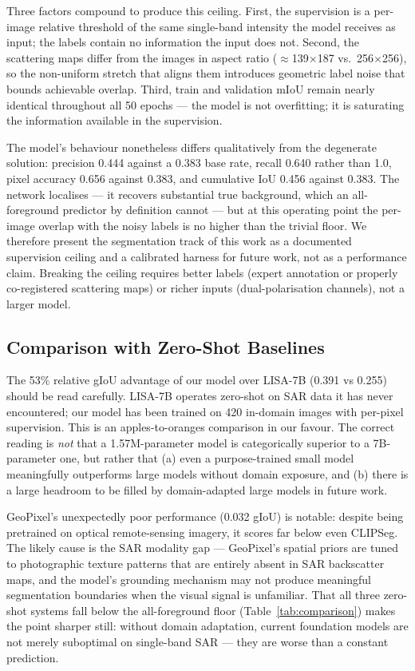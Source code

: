 \documentclass[remotesensing,article,accept,moreauthors,pdftex]{Definitions/mdpi}
\begin{document}
Three factors compound to produce this ceiling. First, the supervision is a
per-image relative threshold of the same single-band intensity the model
receives as input; the labels contain no information the input does not.
Second, the scattering maps differ from the images in aspect ratio
($\approx$139$\times$187 vs.\ 256$\times$256), so the non-uniform stretch that
aligns them introduces geometric label noise that bounds achievable overlap.
Third, train and validation mIoU remain nearly identical throughout all 50
epochs — the model is not overfitting; it is saturating the information
available in the supervision.

The model's behaviour nonetheless differs qualitatively from the degenerate
solution: precision 0.444 against a 0.383 base rate, recall 0.640 rather than
1.0, pixel accuracy 0.656 against 0.383, and cumulative IoU 0.456 against
0.383. The network localises — it recovers substantial true background, which
an all-foreground predictor by definition cannot — but at this operating point
the per-image overlap with the noisy labels is no higher than the trivial
floor. We therefore present the segmentation track of this work as a
documented supervision ceiling and a calibrated harness for future work, not
as a performance claim. Breaking the ceiling requires better labels (expert
annotation or properly co-registered scattering maps) or richer inputs
(dual-polarisation channels), not a larger model.

\subsection{Comparison with Zero-Shot Baselines}
\label{sec:comparison_analysis}

The 53\% relative gIoU advantage of our model over LISA-7B (0.391 vs 0.255)
should be read carefully. LISA-7B operates zero-shot on SAR data it has never
encountered; our model has been trained on 420 in-domain images with per-pixel
supervision. This is an apples-to-oranges comparison in our favour. The correct
reading is \emph{not} that a 1.57M-parameter model is categorically superior to
a 7B-parameter one, but rather that (a) even a purpose-trained small model
meaningfully outperforms large models without domain exposure, and (b) there is
a large headroom to be filled by domain-adapted large models in future work.

GeoPixel's unexpectedly poor performance (0.032 gIoU) is notable: despite being
pretrained on optical remote-sensing imagery, it scores far below even CLIPSeg.
The likely cause is the SAR modality gap — GeoPixel's spatial priors are tuned
to photographic texture patterns that are entirely absent in SAR backscatter
maps, and the model's grounding mechanism may not produce meaningful
segmentation boundaries when the visual signal is unfamiliar. That all three
zero-shot systems fall below the all-foreground floor
(Table~\ref{tab:comparison}) makes the point sharper still: without domain
adaptation, current foundation models are not merely suboptimal on single-band
SAR — they are worse than a constant prediction.
\end{document}
